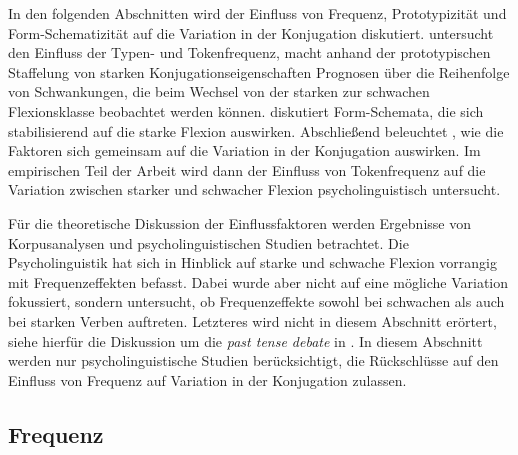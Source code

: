 \begin{sloppypar}
In den folgenden Abschnitten wird der Einfluss von Frequenz, Prototypizität und Form-Schema\-ti\-zi\-tät auf die Variation in der Konjugation diskutiert.  untersucht den Einfluss der Typen- und Tokenfrequenz,  macht anhand der prototypischen Staffelung von starken Konjugationseigenschaften Prognosen über die Reihenfolge von Schwankungen, die beim Wechsel von der starken zur schwachen Flexionsklasse beobachtet werden können.  diskutiert Form-Schemata, die sich stabilisierend auf die starke Flexion auswirken. Abschließend beleuchtet , wie die Faktoren sich gemeinsam auf die Variation in der Konjugation auswirken.  Im empirischen Teil der Arbeit wird dann der Einfluss von Tokenfrequenz auf die Variation zwischen starker und schwacher Flexion psycholinguistisch untersucht. 
\end{sloppypar}


Für die theoretische Diskussion der Einflussfaktoren werden Ergebnisse von Korpusanalysen und psycholinguistischen Studien betrachtet. Die Psycholinguistik hat sich in Hinblick auf starke und schwache Flexion vorrangig mit Frequenzeffekten befasst. Dabei wurde aber nicht auf eine mögliche Variation fokussiert, sondern untersucht, ob Frequenzeffekte sowohl bei schwachen als auch bei starken Verben auftreten. Letzteres wird nicht in diesem Abschnitt erörtert, siehe hierfür die Diskussion um die \textit{past tense debate} in . In diesem Abschnitt werden nur psycholinguistische Studien berücksichtigt, die Rückschlüsse auf den Einfluss von Frequenz auf Variation in der Konjugation zulassen. 

\subsection{Frequenz}
\label{freqverb}

